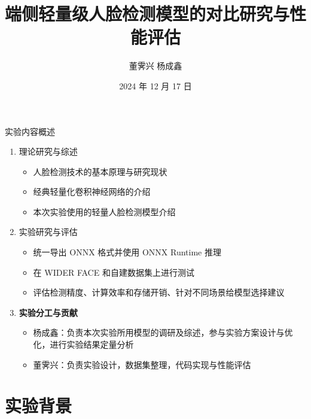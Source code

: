 \documentclass{beamer}
\author{董霁兴 \quad 杨成鑫}  %
\title{端侧轻量级人脸检测模型的对比研究与性能评估}  %
\institute{山东师范大学信息科学与工程学院}  %
\date{2024 年 12 月 17 日}  %
\begin{document}
\kaishu  %
\begin{frame}
    \titlepage  %
\end{frame}

\begin{frame}
    \tableofcontents
\end{frame}

\begin{frame}{实验内容概述}
    \begin{enumerate}
        \item 理论研究与综述
        \begin{itemize}
            \item 人脸检测技术的基本原理与研究现状
            \item 经典轻量化卷积神经网络的介绍
            \item 本次实验使用的轻量人脸检测模型介绍
        \end{itemize}
        \item 实验研究与评估
        \begin{itemize}
            \item 统一导出 ONNX 格式并使用 ONNX Runtime 推理
            \item 在 WIDER FACE 和自建数据集上进行测试
            \item 评估检测精度、计算效率和存储开销、针对不同场景给模型选择建议
        \end{itemize}
        \item \textbf{实验分工与贡献}
        \begin{itemize}
            \item 杨成鑫：负责本次实验所用模型的调研及综述，参与实验方案设计与优化，进行实验结果定量分析
            \item 董霁兴：负责实验设计，数据集整理，代码实现与性能评估
        \end{itemize}
    \end{enumerate}
\end{frame}


\section{实验背景}
\end{document}
